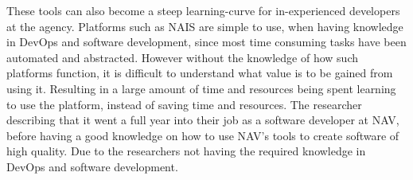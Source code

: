 These tools can also become a steep learning-curve for in-experienced developers at the agency. Platforms such as NAIS are simple to use, when having knowledge in DevOps and software development, since most time consuming tasks have been automated and abstracted. However without the knowledge of how such platforms function, it is difficult to understand what value is to be gained from using it. Resulting in a large amount of time and resources being spent learning to use the platform, instead of saving time and resources. The researcher describing that it went a full year into their job as a software developer at NAV, before having a good knowledge on how to use NAV's tools to create software of high quality. Due to the researchers not having the required knowledge in DevOps and software development. 




